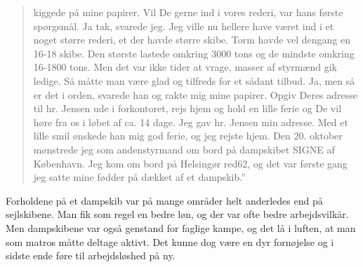 \begin{quote}
kiggede på mine papirer. Vil De gerne ind i vores rederi, var hans
første spørgsmål. Ja tak, svarede jeg. Jeg ville nu hellere have været
ind i et noget større rederi, et der havde større skibe. Torm havde vel
dengang en 16-18 skibe. Den største lastede omkring 3000 tons og de
mindste omkring 16-1800 tons. Men det var ikke tider at vrage, masser af
styrmænd gik ledige. Så måtte man være glad og tilfreds for et sådant
tilbud. Ja, men så er det i orden, svarede han og rakte mig mine
papirer. Opgiv Deres adresse til hr. Jensen ude i forkontoret, rejs hjem
og hold en lille ferie og De vil høre fra os i løbet af ca. 14 dage. Jeg
gav hr. Jensen min adresse. Med et lille smil ønskede han mig god ferie,
og jeg rejste hjem. Den 20. oktober mønstrede jeg som andenstyrmand om
bord på dampskibet SIGNE af København. Jeg kom om bord på Helsingør
red62, og det var første gang jeg satte mine fødder på dækket af et
dampskib.'' 
\end{quote}

Forholdene på et dampskib var på mange områder helt
anderledes end på sejlskibene. Man fik som regel en bedre løn, og der
var ofte bedre arbejdsvilkår. Men dampskibene var også genstand for
faglige kampe, og det lå i luften, at man som matros måtte deltage
aktivt. Det kunne dog være en dyr fornøjelse og i sidste ende føre til
arbejdsløshed på ny. 

